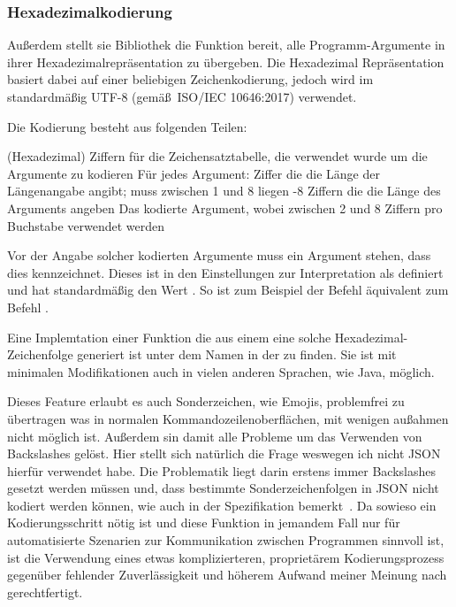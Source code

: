 \subsubsection{Hexadezimalkodierung}\label{Hexadecimalencoding}
Au\ss erdem stellt sie Bibliothek die Funktion bereit, alle Programm-Argumente in ihrer Hexadezimalrepräsentation zu übergeben.
Die Hexadezimal Repräsentation  basiert dabei auf einer beliebigen Zeichenkodierung, jedoch wird im standardmä\ss ig UTF-8 (gemä\ss ~ISO/IEC 10646:2017) verwendet.

Die Kodierung besteht aus folgenden Teilen:
\begin{outline}
  (Hexadezimal) Ziffern für die Zeichensatztabelle, die verwendet wurde um die Argumente zu kodieren
 \1 Für jedes Argument:
   Ziffer die die Länge der Längenangabe angibt;
  muss zwischen 1 und 8 liegen 
  -8 Ziffern die die Länge des Arguments angeben
  \2 Das kodierte Argument, wobei zwischen 2 und 8 Ziffern pro Buchstabe verwendet werden
\end{outline}

Vor der Angabe solcher kodierten Argumente muss ein Argument stehen, dass dies kennzeichnet.
Dieses ist in den Einstellungen zur Interpretation als  definiert und hat standardmä\ss ig den Wert .
So ist zum Beispiel der Befehl  äquivalent zum Befehl .

Eine Implemtation einer Funktion die aus einem  eine solche Hexadezimal-Zeichenfolge generiert ist unter dem Namen  in der  zu finden.
Sie ist mit minimalen Modifikationen auch in vielen anderen Sprachen, wie Java, möglich.

Dieses Feature erlaubt es auch Sonderzeichen, wie Emojis, problemfrei zu übertragen was in normalen Kommandozeilenoberflächen, mit wenigen au\ss ahmen nicht möglich ist.
Au\ss erdem sin damit alle Probleme um das Verwenden von Backslashes gelöst.
Hier stellt sich natürlich die Frage weswegen ich nicht JSON hierfür verwendet habe.
Die Problematik liegt darin erstens immer Backslashes gesetzt werden müssen und, dass bestimmte Sonderzeichenfolgen in JSON nicht kodiert werden können, wie auch in der Spezifikation bemerkt~\cite{JSONSpec}.
Da sowieso ein Kodierungsschritt nötig ist und diese Funktion in jemandem Fall nur für automatisierte Szenarien zur Kommunikation zwischen Programmen sinnvoll ist,
ist die Verwendung eines etwas komplizierteren, proprietärem  Kodierungsprozess gegenüber fehlender Zuverlässigkeit und höherem Aufwand meiner Meinung nach gerechtfertigt.
